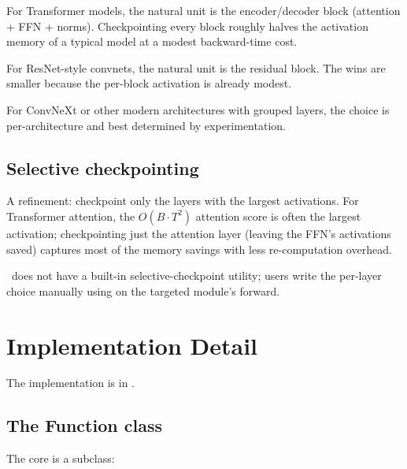 For Transformer models, the natural unit is the encoder/decoder
block (attention + FFN + norms). Checkpointing every block roughly
halves the activation memory of a typical model at a modest
backward-time cost.

For ResNet-style convnets, the natural unit is the residual
block. The wins are smaller because the per-block activation is
already modest.

For ConvNeXt or other modern architectures with grouped layers,
the choice is per-architecture and best determined by
experimentation.

\subsection{Selective checkpointing}
\label{ssec:gradient_checkpointing:selective}

A refinement: checkpoint only the layers with the largest
activations. For Transformer attention, the $O(B \cdot T^2)$
attention score is often the largest activation; checkpointing
just the attention layer (leaving the FFN's activations saved)
captures most of the memory savings with less re-computation
overhead.

\Lucid\ does not have a built-in selective-checkpoint utility;
users write the per-layer choice manually using 
on the targeted module's forward.

\section{Implementation Detail}
\label{sec:gradient_checkpointing:impl}

The implementation is in .

\subsection{The Function class}
\label{ssec:gradient_checkpointing:function_class}

The core is a  subclass:

